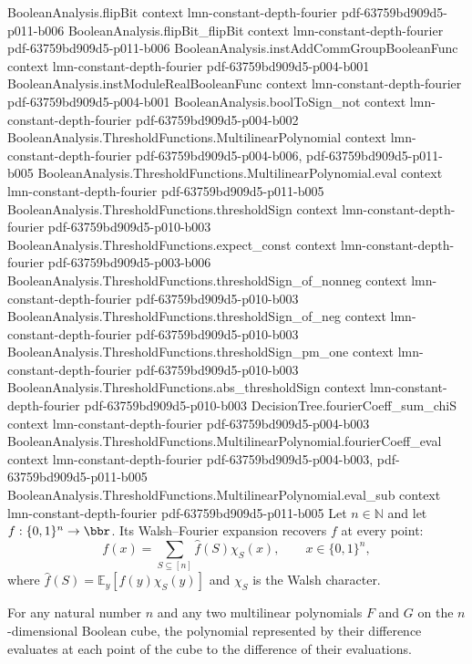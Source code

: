 \begin{lemma}
\proofstep
  {BooleanAnalysis.flipBit}
  {context}
  {lmn-constant-depth-fourier}
  {pdf-63759bd909d5-p011-b006}
\proofstep
  {BooleanAnalysis.flipBit_flipBit}
  {context}
  {lmn-constant-depth-fourier}
  {pdf-63759bd909d5-p011-b006}
\proofstep
  {BooleanAnalysis.instAddCommGroupBooleanFunc}
  {context}
  {lmn-constant-depth-fourier}
  {pdf-63759bd909d5-p004-b001}
\proofstep
  {BooleanAnalysis.instModuleRealBooleanFunc}
  {context}
  {lmn-constant-depth-fourier}
  {pdf-63759bd909d5-p004-b001}
\proofstep
  {BooleanAnalysis.boolToSign_not}
  {context}
  {lmn-constant-depth-fourier}
  {pdf-63759bd909d5-p004-b002}
\proofstep
  {BooleanAnalysis.ThresholdFunctions.MultilinearPolynomial}
  {context}
  {lmn-constant-depth-fourier}
  {pdf-63759bd909d5-p004-b006,
    pdf-63759bd909d5-p011-b005}
\proofstep
  {BooleanAnalysis.ThresholdFunctions.MultilinearPolynomial.eval}
  {context}
  {lmn-constant-depth-fourier}
  {pdf-63759bd909d5-p011-b005}
\proofstep
  {BooleanAnalysis.ThresholdFunctions.thresholdSign}
  {context}
  {lmn-constant-depth-fourier}
  {pdf-63759bd909d5-p010-b003}
\proofstep
  {BooleanAnalysis.ThresholdFunctions.expect_const}
  {context}
  {lmn-constant-depth-fourier}
  {pdf-63759bd909d5-p003-b006}
\proofstep
  {BooleanAnalysis.ThresholdFunctions.thresholdSign_of_nonneg}
  {context}
  {lmn-constant-depth-fourier}
  {pdf-63759bd909d5-p010-b003}
\proofstep
  {BooleanAnalysis.ThresholdFunctions.thresholdSign_of_neg}
  {context}
  {lmn-constant-depth-fourier}
  {pdf-63759bd909d5-p010-b003}
\proofstep
  {BooleanAnalysis.ThresholdFunctions.thresholdSign_pm_one}
  {context}
  {lmn-constant-depth-fourier}
  {pdf-63759bd909d5-p010-b003}
\proofstep
  {BooleanAnalysis.ThresholdFunctions.abs_thresholdSign}
  {context}
  {lmn-constant-depth-fourier}
  {pdf-63759bd909d5-p010-b003}
\proofstep
  {DecisionTree.fourierCoeff_sum_chiS}
  {context}
  {lmn-constant-depth-fourier}
  {pdf-63759bd909d5-p004-b003}
\proofstep
  {BooleanAnalysis.ThresholdFunctions.MultilinearPolynomial.fourierCoeff_eval}
  {context}
  {lmn-constant-depth-fourier}
  {pdf-63759bd909d5-p004-b003,
    pdf-63759bd909d5-p011-b005}
\proofstep
  {BooleanAnalysis.ThresholdFunctions.MultilinearPolynomial.eval_sub}
  {context}
  {lmn-constant-depth-fourier}
  {pdf-63759bd909d5-p011-b005}
Let $n\in\mathbb N$ and let $f:\{0,1\}^n\to\bbr$. Its Walsh–Fourier expansion recovers
$f$ at every point: \[f(x)=\sum_{S\subseteq[n]}\widehat f(S)\chi_S(x),\qquad
x\in\{0,1\}^n,\] where $\widehat f(S)=\mathbb E_y[f(y)\chi_S(y)]$ and $\chi_S$ is the
Walsh character.
\end{lemma}

\begin{lemma}
\label{BooleanAnalysis.ThresholdFunctions.MultilinearPolynomial.eval_sub}
\leanok
{}
For any natural number $n$ and any two multilinear polynomials $F$ and $G$ on the
$n$-dimensional Boolean cube, the polynomial represented by their difference evaluates
at each point of the cube to the difference of their evaluations.
\end{lemma}
